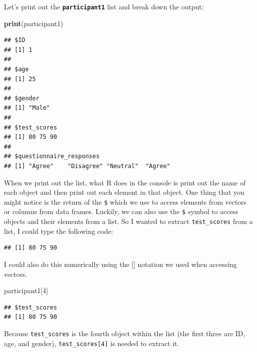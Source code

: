 \documentclass[
]{book}
\newenvironment{Shaded}{\begin{snugshade}}{\end{snugshade}}
\newcommand{\DecValTok}[1]{\textcolor[rgb]{0.00,0.00,0.81}{#1}}
\newcommand{\FunctionTok}[1]{\textcolor[rgb]{0.13,0.29,0.53}{\textbf{#1}}}
\newcommand{\NormalTok}[1]{#1}
\newcommand{\SpecialCharTok}[1]{\textcolor[rgb]{0.81,0.36,0.00}{\textbf{#1}}}
\begin{document}
Let's print out the \textbf{\texttt{participant1}} list and break down the output:

\begin{Shaded}
\begin{Highlighting}[]
\FunctionTok{print}\NormalTok{(participant1)}
\end{Highlighting}
\end{Shaded}

\begin{verbatim}
## $ID
## [1] 1
## 
## $age
## [1] 25
## 
## $gender
## [1] "Male"
## 
## $test_scores
## [1] 80 75 90
## 
## $questionnaire_responses
## [1] "Agree"    "Disagree" "Neutral"  "Agree"
\end{verbatim}

When we print out the list, what R does in the console is print out the name of each object and then print out each element in that object. One thing that you might notice is the return of the \texttt{\$} which we use to access elements from vectors or columns from data frames. Luckily, we can also use the \texttt{\$} symbol to access objects and their elements from a list. So I wanted to extract \texttt{test\_scores} from a list, I could type the following code:

\begin{Shaded}
\end{Shaded}

\begin{verbatim}
## [1] 80 75 90
\end{verbatim}

I could also do this numerically using the {[}{]} notation we used when accessing vectors.

\begin{Shaded}
\begin{Highlighting}[]
\NormalTok{participant1[}\DecValTok{4}\NormalTok{]}
\end{Highlighting}
\end{Shaded}

\begin{verbatim}
## $test_scores
## [1] 80 75 90
\end{verbatim}

Because \texttt{test\_scores} is the fourth object within the list (the first three are ID, age, and gender), \texttt{test\_scores{[}4{]}} is needed to extract it.
\end{document}
